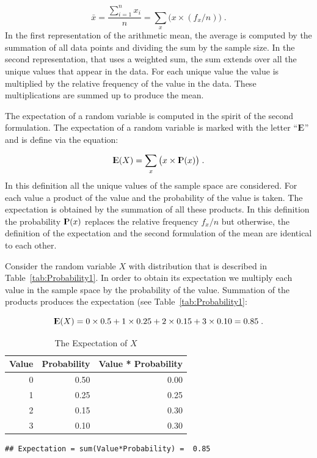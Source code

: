 \documentclass[]{krantz}
\newcommand{\Expec}{{\rm I\kern-.3em E}}
\newcommand{\Prob}{{\rm I\kern-.3em P}}
\theoremstyle{definition}
\theoremstyle{definition}
\theoremstyle{definition}
\theoremstyle{remark}
\begin{document}
\[\bar x = \frac{\sum_{i=1}^n x_i}{n} = \sum_x \big(x \times (f_x/n)\big)\;.\]
In the first representation of the arithmetic mean, the average is
computed by the summation of all data points and dividing the sum by the
sample size. In the second representation, that uses a weighted sum, the
sum extends over all the unique values that appear in the data. For each
unique value the value is multiplied by the relative frequency of the
value in the data. These multiplications are summed up to produce the
mean.

The expectation of a random variable is computed in the spirit of the
second formulation. The expectation of a random variable is marked with
the letter ``\(\Expec\)'' and is define via the equation:

\[\Expec(X) = \sum_x \big(x \times \Prob(x)\big)\;.\] In this definition
all the unique values of the sample space are considered. For each value
a product of the value and the probability of the value is taken. The
expectation is obtained by the summation of all these products. In this
definition the probability \(\Prob(x)\) replaces the relative frequency
\(f_x/n\) but otherwise, the definition of the expectation and the
second formulation of the mean are identical to each other.

Consider the random variable \(X\) with distribution that is described
in Table~\ref{tab:Probability1}. In order to obtain its expectation we
multiply each value in the sample space by the probability of the value.
Summation of the products produces the expectation (see
Table~\ref{tab:Probability1}:

\[\Expec(X) = 0 \times 0.5 + 1 \times 0.25 + 2 \times 0.15 + 3\times 0.10 = 0.85\;.\]

\begin{table}

\caption{\label{tab:Probability2}The Expectation of $X$}
\centering
\begin{tabular}[t]{rrr}
\toprule
Value & Probability & Value * Probability\\
\midrule
0 & 0.50 & 0.00\\
1 & 0.25 & 0.25\\
2 & 0.15 & 0.30\\
3 & 0.10 & 0.30\\
\bottomrule
\end{tabular}
\end{table}

\begin{verbatim}
## Expectation = sum(Value*Probability) =  0.85
\end{verbatim}
\end{document}
